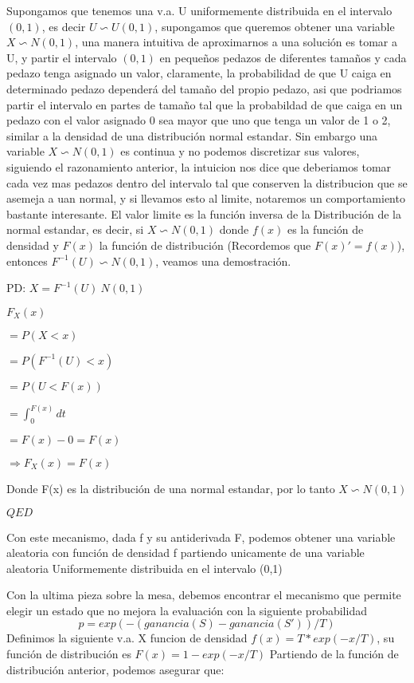 \documentclass{article}
\begin{document}
		Supongamos que tenemos una v.a. U uniformemente distribuida en el intervalo $(0,1)$, es decir $U \backsim U(0,1)$, supongamos que queremos obtener una variable $X \backsim N(0,1)$, una manera intuitiva de aproximarnos
		a una solución es tomar a U, y partir el intervalo $(0,1)$ en pequeños pedazos de diferentes tamaños y cada pedazo tenga asignado un valor, claramente, la probabilidad de que U caiga en determinado 
		pedazo dependerá del tamaño del propio pedazo, asi que podriamos partir el intervalo en partes de tamaño tal que la probabildad de que caiga en un pedazo con el valor asignado 0 sea mayor que uno 
		que tenga un valor de 1 o 2, similar a la densidad de una distribución normal estandar. Sin embargo una variable $X \backsim N(0,1)$ es continua y no podemos discretizar sus valores, siguiendo el razonamiento 
		anterior, la intuicion nos dice que deberiamos tomar cada vez mas pedazos dentro del intervalo tal que conserven la distribucion que se asemeja a uan normal, y si llevamos esto al limite, notaremos 
		un comportamiento bastante interesante. El valor limite es la función inversa de la Distribución de la normal estandar, es decir, si $X \backsim N(0,1)$ donde $f(x)$ es la función de densidad y $F(x)$ la función de distribución (Recordemos que $F(x)' = f(x)$), entonces $F^{-1}(U) \backsim N(0,1)$, veamos una demostración.

	
		PD: $  X = F^{-1}(U) ~ N(0,1)$
		

		$F_X(x) $
		
		$= P(X < x)$ 
		
		$= P(F^{-1}(U) < x) $
		
		$= P( U < F(x))$
		 
		$= \int_{0}^{F(x)} dt$		
		
		$= F(x) - 0 = F(x)$

		$\Rightarrow F_X(x) = F(x)$

		Donde F(x) es la distribución de una normal estandar, por lo tanto
		$X \backsim N(0,1)$	
		
		$QED$


		Con este mecanismo, dada f y su antiderivada F, podemos obtener una variable aleatoria con función de densidad f partiendo unicamente de una variable aleatoria Uniformemente distribuida en el intervalo (0,1)

	Con la ultima pieza sobre la mesa, debemos encontrar el mecanismo que permite elegir un estado que no mejora la evaluación con la siguiente probabilidad
\begin{equation*}
			p = exp(-(ganancia(S) - ganancia(S'))/T)
\end{equation*}
	Definimos la siguiente v.a. X funcion de densidad $f(x) = T*exp(-x/T)$, su función de distribución es $F(x) = 1 - exp(-x/T)$
	Partiendo de la función de distribución anterior, podemos asegurar que:
\end{document}
